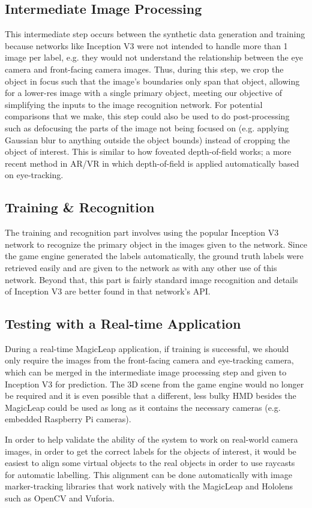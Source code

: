 \subsection{Intermediate Image Processing}

This intermediate step occurs between the synthetic data generation and training
because networks like Inception V3 were not intended to handle more than 1 image
per label, e.g. they would not understand the relationship between the eye
camera and front-facing camera images. Thus, during this step, we crop the
object in focus such that the image's boundaries only span that object, allowing
for a lower-res image with a single primary object, meeting our objective of
simplifying the inputs to the image recognition network. For potential
comparisons that we make, this step could also be used to do post-processing
such as defocusing the parts of the image not being focused on (e.g. applying
Gaussian blur to anything outside the object bounds) instead of cropping the
object of interest. This is similar to how foveated depth-of-field works; a more
recent method in AR/VR in which depth-of-field is applied automatically based on
eye-tracking.

\subsection{Training \& Recognition}

The training and recognition part involves using the popular Inception V3
network to recognize the primary object in the images given to the network.
Since the game engine generated the labels automatically, the ground truth
labels were retrieved easily and are given to the network as with any other use
of this network. Beyond that, this part is fairly standard image recognition and
details of Inception V3 are better found in that network's API\@.

\subsection{Testing with a Real-time Application}

During a real-time MagicLeap application, if training is successful, we should
only require the images from the front-facing camera and eye-tracking camera,
which can be merged in the intermediate image processing step and given to
Inception V3 for prediction. The 3D scene from the game engine would no longer
be required and it is even possible that a different, less bulky HMD besides the
MagicLeap could be used as long as it contains the necessary cameras (e.g.
embedded Raspberry Pi cameras).

In order to help validate the ability of the system to work on real-world camera
images, in order to get the correct labels for the objects of interest, it would
be easiest to align some virtual objects to the real objects in order to use
raycasts for automatic labelling. This alignment can be done automatically with
image marker-tracking libraries that work natively with the MagicLeap and
Hololens such as OpenCV and Vuforia.
